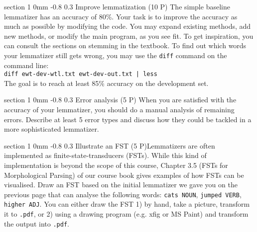 \documentclass[11pt]{article}
\makeatletter
\newcommand{\newsec}[2]{\section{#1}\label{sec:#2}\noindent}
\renewcommand{\section}{\@startsection
{section}%
{1}%
{0mm}%
{-0.8\baselineskip}%
{0.3\baselineskip}%
{\bfseries\large}}%
\makeatother
\begin{document}
\newsec{Improve lemmatization (10 P)}{improve}%
The simple baseline lemmatizer has an accuracy of 80\%. Your task is
to improve the accuracy as much as possible by modifying the code. You
may expand existing methods,
add new methods, or modify the main program, as you see fit. To get inspiration, you can consult the sections on stemming in the textbook. To find out which words your lemmatizer still gets wrong, you may use the \texttt{diff} command on the command line:\\

\noindent
\texttt{diff ewt-dev-wtl.txt ewt-dev-out.txt | less}\\

\noindent
The goal is to reach at least 85\% accuracy on the development set.

\newsec{Error analysis (5 P)}{error}%
When you are satisfied with the accuracy of your lemmatizer, you
should do a manual analysis of remaining errors. Describe at least 5
error types and discuss how they could be tackled in a more
sophisticated lemmatizer.

\newsec{Illustrate an FST (5 P)} %
LLemmatizers are often implemented as finite-state-transducers
(FSTs). While this kind of implementation is beyond the scope of this
course, Chapter 3.5 (FSTs for Morphological Parsing) of our course
book gives examples of how FSTs can be visualised. Draw an FST based
on the initial lemmatizer we gave you on the previous page that can
analyse the following words: \texttt{cats NOUN}, \texttt{jumped VERB},
\texttt{higher ADJ}. You can either draw the FST 1) by hand, take a
picture, transform it to \texttt{.pdf}, or 2) using a drawing program
(e.g. xfig or MS Paint) and transform the output into \texttt{.pdf}.
\end{document}
